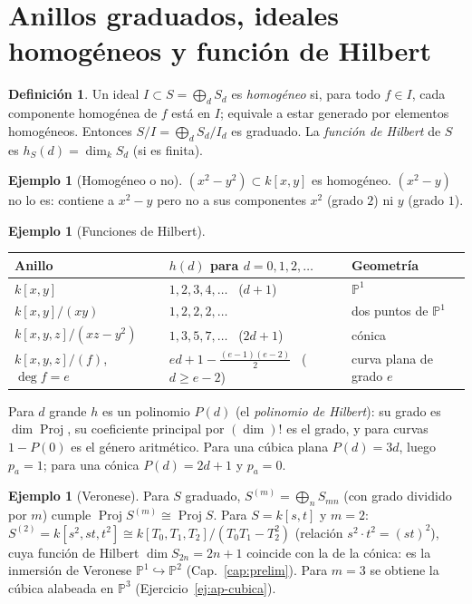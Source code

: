 \documentclass[11pt,a4paper,oneside]{book}
\newcommand{\Proj}{\operatorname{Proj}}
\newcommand{\PP}{\mathbb{P}}
\theoremstyle{plain}
\theoremstyle{definition}
\newtheorem{definicion}[teorema]{Definición}
\newtheorem{ejemplo}[teorema]{Ejemplo}
\theoremstyle{remark}
\begin{document}
\section{Anillos graduados, ideales homogéneos y función de Hilbert}

\begin{definicion}
Un ideal $I\subset S=\bigoplus_dS_d$ es \emph{homogéneo} si, para todo $f\in I$, cada componente homogénea de $f$ está en $I$; equivale a estar generado por elementos homogéneos. Entonces $S/I=\bigoplus_dS_d/I_d$ es graduado. La \emph{función de Hilbert} de $S$ es $h_S(d)=\dim_kS_d$ (si es finita).
\end{definicion}

\begin{ejemplo}[Homogéneo o no]
$(x^2-y^2)\subset k[x,y]$ es homogéneo. $(x^2-y)$ no lo es: contiene a $x^2-y$ pero no a sus componentes $x^2$ (grado $2$) ni $y$ (grado $1$).
\end{ejemplo}

\begin{ejemplo}[Funciones de Hilbert]\label{ej:hilbert}
\begin{center}
\begin{tabular}{@{}p{4.6cm}p{5.2cm}p{3.2cm}@{}}
\toprule
Anillo & $h(d)$ para $d=0,1,2,\dots$ & Geometría \\
\midrule
$k[x,y]$ & $1,2,3,4,\dots$ \ ($d+1$) & $\PP^1$ \\
$k[x,y]/(xy)$ & $1,2,2,2,\dots$ & dos puntos de $\PP^1$ \\
$k[x,y,z]/(xz-y^2)$ & $1,3,5,7,\dots$ \ ($2d+1$) & cónica \\
$k[x,y,z]/(f)$, $\deg f=e$ & $ed+1-\tfrac{(e-1)(e-2)}2$ \ ($d\ge e-2$) & curva plana de grado $e$ \\
\bottomrule
\end{tabular}
\end{center}
Para $d$ grande $h$ es un polinomio $P(d)$ (el \emph{polinomio de Hilbert}): su grado es $\dim\Proj$, su coeficiente principal por $(\dim)!$ es el grado, y para curvas $1-P(0)$ es el género aritmético. Para una cúbica plana $P(d)=3d$, luego $p_a=1$; para una cónica $P(d)=2d+1$ y $p_a=0$.
\end{ejemplo}

\begin{ejemplo}[Veronese]\label{ej:veronese}
Para $S$ graduado, $S^{(m)}=\bigoplus_nS_{mn}$ (con grado dividido por $m$) cumple $\Proj S^{(m)}\cong\Proj S$. Para $S=k[s,t]$ y $m=2$: $S^{(2)}=k[s^2,st,t^2]\cong k[T_0,T_1,T_2]/(T_0T_1-T_2^2)$ (relación $s^2\cdot t^2=(st)^2$), cuya función de Hilbert $\dim S_{2n}=2n+1$ coincide con la de la cónica: es la inmersión de Veronese $\PP^1\hookrightarrow\PP^2$ (Cap.~\ref{cap:prelim}). Para $m=3$ se obtiene la cúbica alabeada en $\PP^3$ (Ejercicio~\ref{ej:ap-cubica}).
\end{ejemplo}
\end{document}
